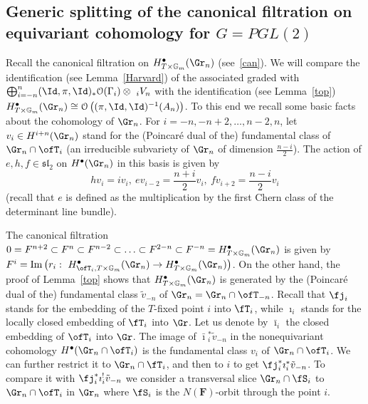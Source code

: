 \documentclass[11pt]{amsart}
\theoremstyle{definition}
\theoremstyle{remark}
\renewcommand{\O}{{\mathcal O}}
\theoremstyle{remark}
\newcommand{\cal}{\mathcal}
\newcommand{\<}{\langle}
\renewcommand{\>}{\rangle}
\renewcommand{\O}{{\cal O}}
\newcommand{\Gm}{{{\mathbb G}_m}}
\begin{document}
\subsection{Generic splitting of the canonical filtration on equivariant
cohomology for $G=PGL(2)$}
\label{?}
Recall the canonical filtration on
$H^\bullet_{T\times\Gm}(\Gr_n)$ (see~\ref{can}). 
We will compare the identification
(see Lemma~\ref{Harvard}) of the associated graded with 
$\bigoplus_{i=-n}^n(\Id,\pi,\Id)_*\O(\Gamma_i)\otimes\ _iV_n$ with the
identification (see Lemma~\ref{top}) 
$H^\bullet_{T\times\Gm}(\Gr_n)\cong\O\left((\pi,\Id,\Id)^{-1}(A_n)\right)$.
To this end we recall some basic facts about the cohomology of $\Gr_n$.
For $i=-n,-n+2,\ldots,n-2,n$, let $v_i\in H^{i+n}(\Gr_n)$ stand for 
the (Poincar{\'e} dual of the) 
fundamental class of $\Gr_n\cap\ofT_i$ (an irreducible subvariety of
$\Gr_n$ of dimension $\frac{n-i}{2}$). 
The action of $e,h,f\in\mathfrak{sl}_2$ on
$H^\bullet(\Gr_n)$ in this basis is given by
$$hv_i=iv_i,\ ev_{i-2}=\frac{n+i}{2}v_i,\ fv_{i+2}=\frac{n-i}{2}v_i$$
(recall that $e$ is defined as the multiplication by the first Chern class
of the determinant line bundle). 

The canonical filtration $0=F^{n+2}\subset F^n\subset F^{n-2}\subset
\ldots\subset F^{2-n}\subset F^{-n}=H^\bullet_{T\times\Gm}(\Gr_n)$ is given
by $F^i=\operatorname{Im}\left(r_i:\ H^\bullet_{\ofT_i,T\times\Gm}(\Gr_n)\to
H^\bullet_{T\times\Gm}(\Gr_n)\right)$.
On the other hand, the proof of Lemma~\ref{top} shows that 
$H^\bullet_{T\times\Gm}(\Gr_n)$ is generated by the (Poincar{\'e} dual of the)
fundamental class $\tilde{v}_{-n}$ of $\Gr_n=\Gr_n\cap\ofT_{-n}$.
Recall that $\fj_i$ stands for the embedding of the $T$-fixed point
$i$ into $\fT_i$, while $\imath_i$ stands for the locally closed 
embedding of $\fT_i$ into $\Gr$. Let us denote by $\bar{\imath}_i$
the closed embedding of $\ofT_i$ into $\Gr$. 
The image of $\bar{\imath}{}^*_i\tilde{v}_{-n}$ in the nonequivariant
cohomology $H^\bullet(\Gr_n\cap\ofT_i)$ is the fundamental class $v_i$ of
$\Gr_n\cap\ofT_i$. We can further restrict it to $\Gr_n\cap\fT_i$,
and then to $i$ to get $\fj_i^*\imath_i^*\tilde{v}_{-n}$.
To compare it with $\fj_i^*\imath_i^!\tilde{v}_{-n}$ we consider
a transversal slice $\Gr_n\cap\fS_i$ to $\Gr_n\cap\ofT_i$ in $\Gr_n$
where $\fS_i$ is the $N({\mathbf F})$-orbit through the point $i$.
\end{document}
